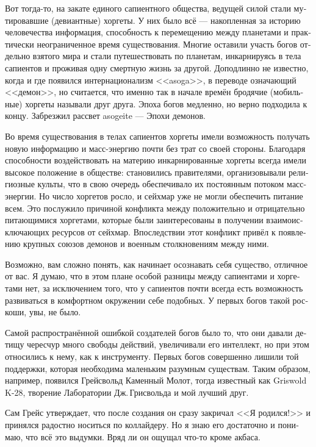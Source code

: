 \documentclass[a4paper,12pt,fleqn]{book}\usepackage{cooltooltips}\usepackage{polyglossia}\setdefaultlanguage[babelshorthands=true]{russian}\setotherlanguage{english}\defaultfontfeatures{Ligatures=TeX,Mapping=tex-text} \usepackage{xcolor}\definecolor{lightgray}{HTML}{bbbbbb}\color{lightgray}\newcommand{\ml}[3]{\textenglish{\textcolor{black}{#3}}}
\newcommand{\textspace}{\vspace{1em}{\centering\Large\bfseries<...>\par}\vspace{1em}}
\begin{document}
{Вот тогда-то, на закате единого сапиентного общества, ведущей силой стали мутировавшие (девиантные) хоргеты.
У них было всё --- накопленная за историю человечества информация, способность к перемещению между планетами и практически неограниченное время существования.
Многие оставили участь богов отдельно взятого мира и стали путешествовать по планетам, инкарнируясь в тела сапиентов и проживая одну смертную жизнь за другой.
Доподлинно не известно, когда и где появился интернационализм <<asoga>>, в переводе означающий <<демон>>, но считается, что именно так в начале времён бродячие (мобильные) хоргеты называли друг друга.
Эпоха богов медленно, но верно подходила к концу.
Забрезжил рассвет asogeite --- Эпохи демонов.

Во время существования в телах сапиентов хоргеты имели возможность получать новую информацию и масс-энергию почти без трат со своей стороны.
Благодаря способности воздействовать на материю инкарнированные хоргеты всегда имели высокое положение в обществе: становились правителями, организовывали религиозные культы, что в свою очередь обеспечивало их постоянным потоком масс-энергии.
Но число хоргетов росло, и сейхмар уже не могли обеспечить питание всем.
Это послужило причиной конфликта между положительно и отрицательно питающимися хоргетами, которые были заинтересованы в получении взаимоисключающих ресурсов от сейхмар.
Впоследствии этот конфликт привёл к появлению крупных союзов демонов и военным столкновениям между ними.

\textspace

Возможно, вам сложно понять, как начинает осознавать себя существо, отличное от вас.
Я думаю, что в этом плане особой разницы между сапиентами и хоргетами нет, за исключением того, что у сапиентов почти всегда есть возможность развиваться в комфортном окружении себе подобных.
У первых богов такой роскоши, увы, не было.

Самой распространённой ошибкой создателей богов было то, что они давали детищу чересчур много свободы действий, увеличивали его интеллект, но при этом относились к нему, как к инструменту.
Первых богов совершенно лишили той поддержки, которая необходима маленьким разумным существам.
Таким образом, например, появился Грейсвольд Каменный Молот, тогда известный как Griswold K-28, творение Лаборатории Дж.\,Грисвольда и мой лучший друг.

Сам Грейс утверждает, что после создания он сразу закричал <<Я родился!>> и принялся радостно носиться по коллайдеру.
Но я знаю его достаточно и понимаю, что всё это выдумки.
Вряд ли он ощущал что-то кроме акбаса.

}
\end{document}
